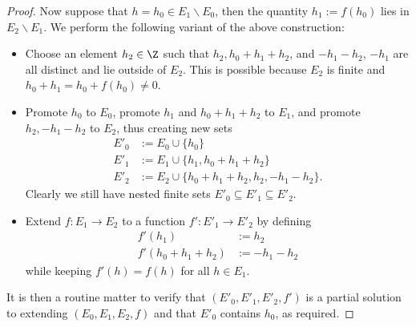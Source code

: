 \begin{proof}
Now suppose that $h = h_0 \in E_1 \backslash E_0$, then the quantity $h_1 := f(h_0)$ lies in $E_2 \backslash E_1$.  We perform the following variant of the above construction:
\begin{itemize}
\item Choose an element $h_2 \in \Z$ such that $h_2, h_0+h_1+h_2$, and $-h_1-h_2$, $-h_1$ are all distinct and lie outside of $E_2$.  This is possible because $E_2$ is finite and $h_0+h_1 = h_0+f(h_0) \neq 0$.
\item Promote $h_0$ to $E_0$, promote $h_1$ and $h_0+h_1+h_2$ to $E_1$, and promote $h_2, -h_1-h_2$ to $E_2$, thus creating new sets
\begin{align*}
  E'_0 &:= E_0 \cup \{h_0\} \\
  E'_1 &:= E_1 \cup \{h_1, h_0+h_1+h_2\} \\
  E'_2 &:= E_2 \cup \{h_0+h_1+h_2, h_2, -h_1-h_2\}.
\end{align*}
Clearly we still have nested finite sets $E'_0 \subseteq E'_1 \subseteq E'_2$.
\item Extend $f : E_1 \to E_2$ to a function $f': E'_1 \to E'_2$ by defining
\begin{align*}
  f'(h_1) &:= h_2 \\
  f'(h_0+h_1+h_2) &:= -h_1-h_2
\end{align*}
while keeping $f'(h)=f(h)$ for all $h \in E_1$.
\end{itemize}
It is then a routine matter to verify that $(E'_0,E'_1,E'_2,f')$ is a partial solution to  extending $(E_0,E_1,E_2,f)$ and that $E'_0$ contains $h_0$, as required.


\end{proof}
